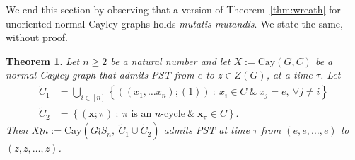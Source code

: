 \documentclass{amsart}
\theoremstyle{plain}
\newtheorem{theorem}{Theorem}[section]
\theoremstyle{remark}\newtheorem{con}[theorem]{Construction}
\theoremstyle{remark} \newtheorem*{remark}{Remark}
\theoremstyle{remark} \newtheorem{example}{Example}
\newcommand{\mrm}{\mathrm}
\newcommand{\mbf}{\mathbf}
\begin{document}
We end this section by observing that a version of Theorem~\ref{thm:wreath} for unoriented normal Cayley graphs holds {\it mutatis mutandis}. We state the same, without proof.

\begin{theorem}\label{thm:wreathundirected}
Let $n\geq 2$ be a natural number and let $X:=\mrm{Cay}(G,C)$ be a normal Cayley graph that admits PST from $e$ to $z\in Z(G)$, at a time $\tau$. 
Let 
\begin{subequations}
\begin{align*}
\tilde{C}_{1} &=  \bigcup\limits_{i \in [n]} \left\{((x_{1}, \ldots x_{n}); (1))\ :\ x_{i}\in C\ \& \ x_{j}=e,\ \forall j\neq i\right\}\\
\tilde{C}_{2} &= \left\{(\mbf{x};\pi)\ :\ \text{$\pi$ is an $n$-cycle}\ \&\ \mbf{x}_{\pi}\in C\right\}.
\end{align*} 
\end{subequations}
Then $X \wr n := \mrm{Cay}(G\wr S_{n},\ \tilde{C}_{1}\cup \tilde{C}_{2})$ admits PST at time $\tau$ from $(e,e,\ldots, e)$ to $(z,z,\ldots, z)$.    
\end{theorem}

%
%    
\end{document}
